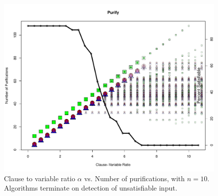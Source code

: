 \begin{figure}[htdp]

\begin{center}

\includegraphics[width=1.1\textwidth]{./figures/metricOutput_n10/purifyCount.pdf}

\caption{Clause to variable ratio $\alpha$ vs. Number of purifications, with $n = 10$.  Algorithms terminate on detection of unsatisfiable input. }
\label{purifyFig_10}
\end{center}
\end{figure}

\FloatBarrier


